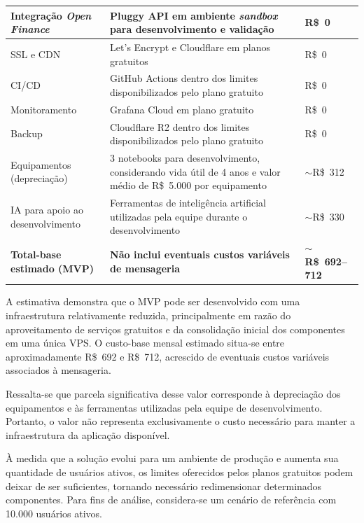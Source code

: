 {\begin{longtable}{|p{3.5cm}|p{7.0cm}|p{3.0cm}|}
Integração \textit{Open Finance} &
Pluggy API em ambiente \textit{sandbox} para desenvolvimento e validação &
R\$~0 \\ \hline

SSL e CDN &
Let's Encrypt e Cloudflare em planos gratuitos &
R\$~0 \\ \hline

CI/CD &
GitHub Actions dentro dos limites disponibilizados pelo plano gratuito &
R\$~0 \\ \hline

Monitoramento &
Grafana Cloud em plano gratuito &
R\$~0 \\ \hline

Backup &
Cloudflare R2 dentro dos limites disponibilizados pelo plano gratuito &
R\$~0 \\ \hline

Equipamentos (depreciação) &
3 notebooks para desenvolvimento, considerando vida útil de 4 anos e valor médio de R\$~5.000 por equipamento &
$\sim$R\$~312 \\ \hline

IA para apoio ao desenvolvimento &
Ferramentas de inteligência artificial utilizadas pela equipe durante o desenvolvimento &
$\sim$R\$~330 \\ \hline

\textbf{Total-base estimado (MVP)} &
\textbf{Não inclui eventuais custos variáveis de mensageria} &
\textbf{$\sim$R\$~692--712} \\ \hline

\end{longtable}
}

A estimativa demonstra que o MVP pode ser desenvolvido com uma infraestrutura relativamente reduzida, principalmente em razão do aproveitamento de serviços gratuitos e da consolidação inicial dos componentes em uma única VPS. O custo-base mensal estimado situa-se entre aproximadamente R\$~692 e R\$~712, acrescido de eventuais custos variáveis associados à mensageria.

Ressalta-se que parcela significativa desse valor corresponde à depreciação dos equipamentos e às ferramentas utilizadas pela equipe de desenvolvimento. Portanto, o valor não representa exclusivamente o custo necessário para manter a infraestrutura da aplicação disponível.

À medida que a solução evolui para um ambiente de produção e aumenta sua quantidade de usuários ativos, os limites oferecidos pelos planos gratuitos podem deixar de ser suficientes, tornando necessário redimensionar determinados componentes. Para fins de análise, considera-se um cenário de referência com 10.000 usuários ativos.

